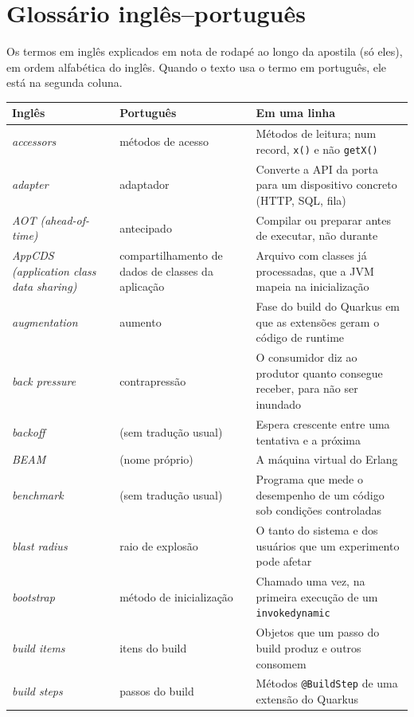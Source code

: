 \chapter{Glossário inglês--português}
\label{ap:glossario}

Os termos em inglês explicados em nota de rodapé ao longo da apostila (só
eles), em ordem alfabética do inglês. Quando o texto usa o termo em
português, ele está na segunda coluna.

\small
\begin{longtable}{@{}>{\raggedright}p{3.9cm} >{\raggedright}p{3.6cm} >{\raggedright\arraybackslash}p{6.3cm}@{}}
\toprule
Inglês & Português & Em uma linha \\
\midrule \endhead
\textit{accessors} & métodos de acesso & Métodos de leitura; num record, \texttt{x()} e não \texttt{getX()} \\
\textit{adapter} & adaptador & Converte a API da porta para um dispositivo concreto (HTTP, SQL, fila) \\
\textit{AOT (ahead-of-time)} & antecipado & Compilar ou preparar antes de executar, não durante \\
\textit{AppCDS (application class data sharing)} & compartilhamento de dados de classes da aplicação & Arquivo com classes já processadas, que a JVM mapeia na inicialização \\
\textit{augmentation} & aumento & Fase do build do Quarkus em que as extensões geram o código de runtime \\
\textit{back pressure} & contrapressão & O consumidor diz ao produtor quanto consegue receber, para não ser inundado \\
\textit{backoff} & (sem tradução usual) & Espera crescente entre uma tentativa e a próxima \\
\textit{BEAM} & (nome próprio) & A máquina virtual do Erlang \\
\textit{benchmark} & (sem tradução usual) & Programa que mede o desempenho de um código sob condições controladas \\
\textit{blast radius} & raio de explosão & O tanto do sistema e dos usuários que um experimento pode afetar \\
\textit{bootstrap} & método de inicialização & Chamado uma vez, na primeira execução de um \texttt{invokedynamic} \\
\textit{build items} & itens do build & Objetos que um passo do build produz e outros consomem \\
\textit{build steps} & passos do build & Métodos \texttt{@BuildStep} de uma extensão do Quarkus \\

\end{longtable}

